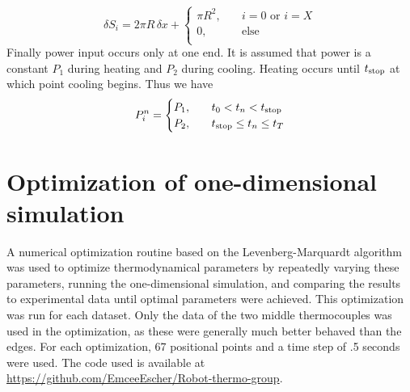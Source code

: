 \documentclass[letterpaper,titlepage,oneside]{report}
\begin{document}
\begin{equation*}
  \delta S_i = 2\pi R\,\delta x +
  \begin{cases}
    \pi R^2, & \quad i=0 \text{ or } i=X\\
    0,       & \quad \text{else}\\
  \end{cases}
\end{equation*}
Finally power input occurs only at one end. It is assumed that
power is a constant $P_1$ during heating and $P_2$ during cooling.
Heating occurs until $t_{\rm{stop}}$ at which point cooling begins.
Thus we have
\begin{equation*}
  P_i^n =
  \begin{cases}
    P_1, & \quad t_0 < t_n < t_{\rm{stop}}\\
    P_2, & \quad t_{\rm{stop}} \leq t_n \leq t_T\\
  \end{cases}
\end{equation*}

\section{Optimization of one-dimensional simulation}
A numerical optimization routine based on the
Levenberg-Marquardt algorithm was used to optimize
thermodynamical parameters by repeatedly varying these parameters,
running the one-dimensional simulation, and comparing the results to
experimental data until optimal parameters were achieved.
This optimization was run for each dataset.
Only the data of the two middle thermocouples was used in the optimization,
as these were generally much better behaved than the edges.
For each optimization, 67 positional points and a time step of .5 seconds
were used. The code used is available at
\url{https://github.com/EmceeEscher/Robot-thermo-group}.
\end{document}
